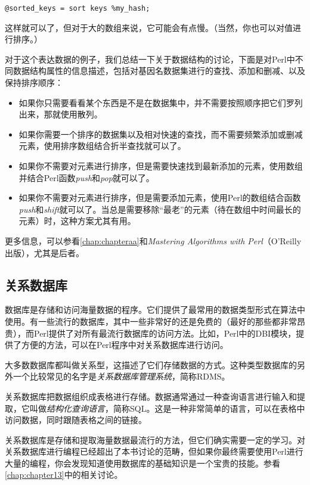 \begin{lstlisting}
@sorted_keys = sort keys %my_hash;
\end{lstlisting}

这样就可以了，但对于大的数组来说，它可能会有点慢。（当然，你也可以对值进行排序。）

对于这个表达数据的例子，我们总结一下关于数据结构的讨论，下面是对Perl中不同数据结构属性的信息描述，包括对基因名数据集进行的查找、添加和删减、以及保持排序顺序：

\begin{itemize}
  \item 如果你只需要看看某个东西是不是在数据集中，并不需要按照顺序把它们罗列出来，那就使用散列。
  \item 如果你需要一个排序的数据集以及相对快速的查找，而不需要频繁添加或删减元素，使用排序数组结合折半查找就可以了。
  \item
    如果你不需要对元素进行排序，但是需要快速找到最新添加的元素，使用数组并结合Perl函数\textit{push}和\textit{pop}就可以了。
  \item
    如果你不需要对元素进行排序，但是需要添加元素，使用Perl的数组结合函数\textit{push}和\textit{shift}就可以了。当总是需要移除“最老”的元素（待在数组中时间最长的元素）时，这种方案尤其有用。
\end{itemize}

更多信息，可以参看\autoref{chap:chapteraa}和\textit{Mastering Algorithms with Perl}（O'Reilly出版），尤其是后者。

\subsection{关系数据库}
数据库是存储和访问海量数据的程序。它们提供了最常用的数据类型形式在算法中使用。有一些流行的数据库，其中一些非常好的还是免费的（最好的那些都非常昂贵），而Perl提供了对所有最流行数据库的访问方法。比如，Perl中的DBI模块，提供了方便的方法，可以在Perl程序中对关系数据库进行访问。

大多数数据库都叫做关系型，这描述了它们存储数据的方式。这种类型数据库的另外一个比较常见的名字是\textit{关系数据库管理系统}，简称RDMS。

关系数据库把数据组织成表格进行存储。数据通常通过一种查询语言进行输入和提取，它叫做\textit{结构化查询语言}，简称SQL。这是一种非常简单的语言，可以在表格中访问数据，同时跟随表格之间的链接。

关系数据库是存储和提取海量数据最流行的方法，但它们确实需要一定的学习。对关系数据库进行编程已经超出了本书讨论的范畴，但如果你最终需要使用Perl进行大量的编程，你会发现知道使用数据库的基础知识是一个宝贵的技能。参看\autoref{chap:chapter13}中的相关讨论。

